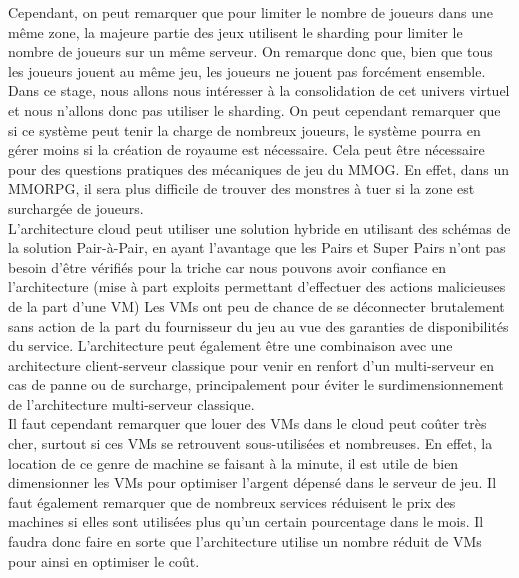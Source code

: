 Cependant, on peut remarquer que pour limiter le nombre de joueurs dans une même zone, la majeure partie des jeux utilisent le sharding pour limiter le nombre de joueurs sur un même serveur. On remarque donc que, bien que tous les joueurs jouent au même jeu, les joueurs ne jouent pas forcément ensemble. Dans ce stage, nous allons nous intéresser à la consolidation de cet univers virtuel et nous n'allons donc pas utiliser le sharding. On peut cependant remarquer que si ce système peut tenir la charge de nombreux joueurs, le système pourra en gérer moins si la création de royaume est nécessaire. Cela peut être nécessaire pour des questions pratiques des mécaniques de jeu du MMOG. En effet, dans un MMORPG, il sera plus difficile de trouver des monstres à tuer si la zone est surchargée de joueurs.\\

L'architecture cloud peut utiliser une solution hybride en utilisant des schémas de la solution Pair-à-Pair, en ayant l'avantage que les Pairs et Super Pairs n'ont pas besoin d'être vérifiés pour la triche car nous pouvons avoir confiance en l'architecture (mise à part exploits permettant d'effectuer des actions malicieuses de la part d'une VM) Les VMs ont peu de chance de se déconnecter brutalement sans action de la part du fournisseur du jeu au vue des garanties de disponibilités du service. L'architecture peut également être une combinaison avec une architecture client-serveur classique pour venir en renfort d'un multi-serveur en cas de panne ou de surcharge, principalement pour éviter le surdimensionnement de l'architecture multi-serveur classique.\\

Il faut cependant remarquer que louer des VMs dans le cloud peut coûter très cher, surtout si ces VMs se retrouvent sous-utilisées et nombreuses. En effet, la location de ce genre de machine se faisant à la minute, il est utile de bien dimensionner les VMs pour optimiser l'argent dépensé dans le serveur de jeu. Il faut également remarquer que de nombreux services réduisent le prix des machines si elles sont utilisées plus qu'un certain pourcentage dans le mois. Il faudra donc faire en sorte que l'architecture utilise un nombre réduit de VMs pour ainsi en optimiser le coût.

